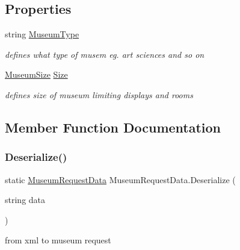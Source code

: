 \subsection*{Properties}
\begin{DoxyCompactItemize}
\item 
string \mbox{\hyperlink{class_museum_request_data_a2b68f4ddd18c2d01fcd44a02a135b58b}{Museum\+Type}}
\begin{DoxyCompactList}\small\item\em defines what type of musem eg. art sciences and so on \end{DoxyCompactList}\item 
\mbox{\hyperlink{_mueseum_request_data_8cs_a462fa84e99cf703318040e54f14146a2}{Museum\+Size}} \mbox{\hyperlink{class_museum_request_data_a8c9489791297c88de3c37c0fe340858d}{Size}}
\begin{DoxyCompactList}\small\item\em defines size of museum limiting displays and rooms \end{DoxyCompactList}\end{DoxyCompactItemize}


\subsection{Member Function Documentation}
\mbox{\label{class_museum_request_data_a927b5c1b4ac92161315f7bb717b7c6e6}} 
\subsubsection{\texorpdfstring{Deserialize()}{Deserialize()}}
{\footnotesize\ttfamily static \mbox{\hyperlink{class_museum_request_data}{Museum\+Request\+Data}} Museum\+Request\+Data.\+Deserialize (\begin{DoxyParamCaption}\item[{string}]{data }\end{DoxyParamCaption})\hspace{0.3cm}{\ttfamily [static]}}



from xml to museum request 

